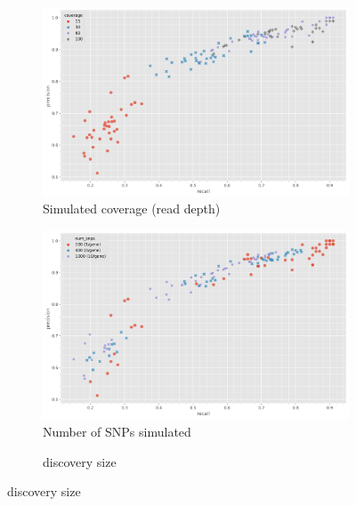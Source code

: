 \begin{figure}
     \centering
     \begin{subfigure}[b]{0.475\textwidth}
        \centering
        \caption[position=above]{Simulated coverage (read depth)}
        \label{fig:denovo-sims-covg}
        \includegraphics[width=1\linewidth]{Chapter1/Figs/denovo_precrec_covg.png}
     \end{subfigure}
     \begin{subfigure}[b]{0.475\textwidth}
         \centering
          \caption[position=above]{Number of SNPs simulated}
         \label{fig:denovo-sims-num-snps}
        \includegraphics[width=1\linewidth]{Chapter1/Figs/denovo_precrec_num_snps.png}
     \end{subfigure}
     \begin{subfigure}[b]{0.475\textwidth}
         \centering
        \caption[position=above]{\denovo{} discovery \kmer{} size}
        \label{fig:denovo-sims-kmer-size}

\end{subfigure}
\end{figure}
